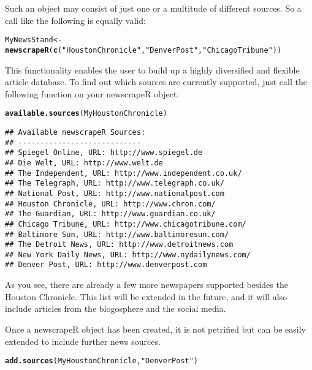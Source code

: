 \documentclass[a4paper,11pt]{article}\usepackage{graphicx, color}
\makeatletter
\newcommand{\hlfunctioncall}[1]{\textcolor[rgb]{0.501960784313725,0,0.329411764705882}{\textbf{#1}}}%
\newcommand{\hlstring}[1]{\textcolor[rgb]{0.6,0.6,1}{#1}}%
\newenvironment{kframe}{%
 \def\at@end@of@kframe{}%
 \ifinner\ifhmode%
  \def\at@end@of@kframe{\end{minipage}}%
  \begin{minipage}{\columnwidth}%
 \fi\fi%
 \def\FrameCommand##1{\hskip\@totalleftmargin \hskip-\fboxsep
 \colorbox{shadecolor}{##1}\hskip-\fboxsep
     \hskip-\linewidth \hskip-\@totalleftmargin \hskip\columnwidth}%
 \MakeFramed {\advance\hsize-\width
   \@totalleftmargin\z@ \linewidth\hsize
   \@setminipage}}%
 {\par\unskip\endMakeFramed%
 \at@end@of@kframe}
\newenvironment{knitrout}{}{} %
\makeatother
\begin{document}
Such an object may consist of just one or a multitude of different sources. So a call like the following is equally valid:

\begin{knitrout}
\color{fgcolor}\begin{kframe}
\begin{alltt}
MyNewsStand <- \hlfunctioncall{newscrapeR}(\hlfunctioncall{c}(\hlstring{"Houston Chronicle"}, \hlstring{"Denver Post"}, \hlstring{"Chicago Tribune"}))
\end{alltt}
\end{kframe}
\end{knitrout}


This functionality enables the user to build up a highly diversified and flexible article database. To find out which sources are currently supported, just call the following function on your newscrapeR object:
\begin{knitrout}
\color{fgcolor}\begin{kframe}
\begin{alltt}
\hlfunctioncall{available.sources}(MyHoustonChronicle)
\end{alltt}
\begin{verbatim}
## Available newscrapeR Sources: 
## ---------------------------- 
## Spiegel Online, URL: http://www.spiegel.de 
## Die Welt, URL: http://www.welt.de 
## The Independent, URL: http://www.independent.co.uk/ 
## The Telegraph, URL: http://www.telegraph.co.uk/ 
## National Post, URL: http://www.nationalpost.com 
## Houston Chronicle, URL: http://www.chron.com/ 
## The Guardian, URL: http://www.guardian.co.uk/ 
## Chicago Tribune, URL: http://www.chicagotribune.com/ 
## Baltimore Sun, URL: http://www.baltimoresun.com/ 
## The Detroit News, URL: http://www.detroitnews.com 
## New York Daily News, URL: http://www.nydailynews.com/ 
## Denver Post, URL: http://www.denverpost.com
\end{verbatim}
\end{kframe}
\end{knitrout}


As you see, there are already a few more newspapers supported besides the Houston Chronicle. This list will be extended in the future, and it will also include articles from the blogosphere and the social media.

Once a newscrapeR object has been created, it is not petrified but can be easily extended to include further news sources.
\begin{knitrout}
\color{fgcolor}\begin{kframe}
\begin{alltt}
\hlfunctioncall{add.sources}(MyHoustonChronicle, \hlstring{"Denver Post"})
\end{alltt}
\end{kframe}
\end{knitrout}
\end{document}
